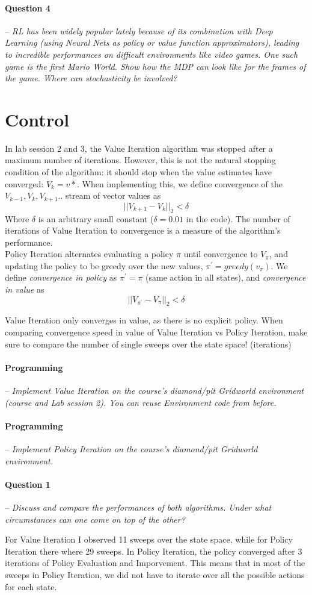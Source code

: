 \documentclass[a4paper]{article}
\newcommand{\question}[2]{
\paragraph{Question #1} -- \textit{#2}

}
\newcommand{\programming}[1]{
\paragraph{Programming} -- \textit{#1}

}
\begin{document}
\question{4}{RL has been widely popular lately because of its combination with Deep Learning (using Neural Nets as policy or value function approximators), leading to incredible performances on difficult environments like video games. One such game is the first Mario World. Show how the MDP can look like for the frames of the game. Where can stochasticity be involved?}


\section{Control}
In lab session 2 and 3, the Value Iteration algorithm was stopped after a maximum number of iterations. However, this is not the natural stopping condition of the algorithm: it should stop when the value estimates have converged: $V_k = v*$. When implementing this, we define convergence of the $V_{k-1},V_k,V_{k+1}..$ stream of vector values as $$ \vert\vert V_{k+1} - V_k \vert\vert_2 < \delta $$
Where $\delta$ is an arbitrary small constant ($\delta = 0.01$ in the code). The number of iterations of Value Iteration to convergence is a measure of the algorithm's performance.\\

Policy Iteration alternates evaluating a policy $\pi$ until convergence to $V_\pi$, and updating the policy to be greedy over the new values, $\pi ^\prime = greedy(v_\pi)$. We define \textit{convergence in policy} as  $\pi^\prime = \pi$ (same action in all states), and \textit{convergence in value} as $$ \vert\vert V_{\pi ^\prime} - V_\pi \vert\vert_2 < \delta $$

Value Iteration only converges in value, as there is no explicit policy. When comparing convergence speed in value of Value Iteration vs Policy Iteration, make sure to compare the number of single sweeps over the state space! (iterations)

\programming{Implement Value Iteration on the course's diamond/pit Gridworld environment (course and Lab session 2). You can reuse Environment code from before.}

\programming{Implement Policy Iteration on the course's diamond/pit Gridworld environment.}

\question{1}{Discuss and compare the performances of both algorithms. Under what circumstances can one come on top of the other?}
For Value Iteration I observed 11 sweeps over the state space, while for Policy Iteration there where 29 sweeps. In Policy Iteration, the policy converged after 3 iterations of Policy Evaluation and Imporvement.
This means that in most of the sweeps in Policy Iteration, we did not have to iterate over all the possible actions for each state.
\end{document}
